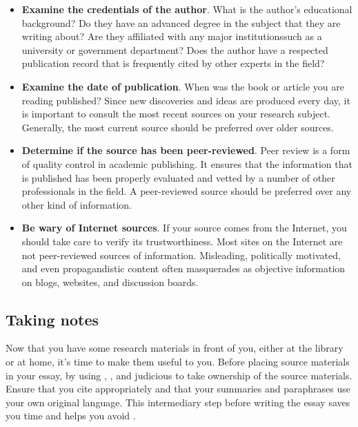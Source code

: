 \begin{itemize} \item \textbf{Examine the credentials of the author}. What is
the author's educational  background? Do they have an advanced degree in the
subject that they are  writing about? Are they affiliated with any major
institutions\textemdash such  as a university or government department? Does the
author have a respected  publication record that is frequently cited by other
experts in the field?

\item \textbf{Examine the date of publication}. When was the book or article
you are reading published? Since new discoveries and ideas are produced every
day, it is important to consult the most recent sources on your research
subject. Generally, the most current source should be preferred over older
sources.

\item \textbf{Determine if the source has been peer-reviewed}. Peer review is a
form of quality control in academic publishing. It ensures that the information
that is published has been properly evaluated and vetted by a number of other
professionals in the field. A peer-reviewed source should be preferred over any
other kind of information.

\item \textbf{Be wary of Internet sources}. If your source comes from the
Internet, you should take care to verify its trustworthiness. Most sites on the
Internet are not peer-reviewed sources of information. Misleading, politically
motivated, and even propagandistic content often masquerades as objective
information on blogs, websites, and discussion boards.  \end{itemize}

\subsection{Taking notes}

Now that you have some research materials in front of you, either at the
library or at home, it's time to make them useful to you. Before placing source
materials in your essay, \hyperlink{notes}{\color{Ahrenge}{take good notes}} by using \hyperlink{summary}{\color{Ahrenge}{summary}}, \hyperlink{paraphrase}{\color{Ahrenge}{paraphrase}}, and judicious \hyperlink{quotation}{\color{Ahrenge}{quotation}} to take ownership of the source materials. Ensure that
you cite appropriately and that your summaries and paraphrases use your own
original language. This intermediary step before writing the essay saves you
time and helps you avoid \hyperlink{plagiarism}{\color{Ahrenge}{plagiarism}}.

